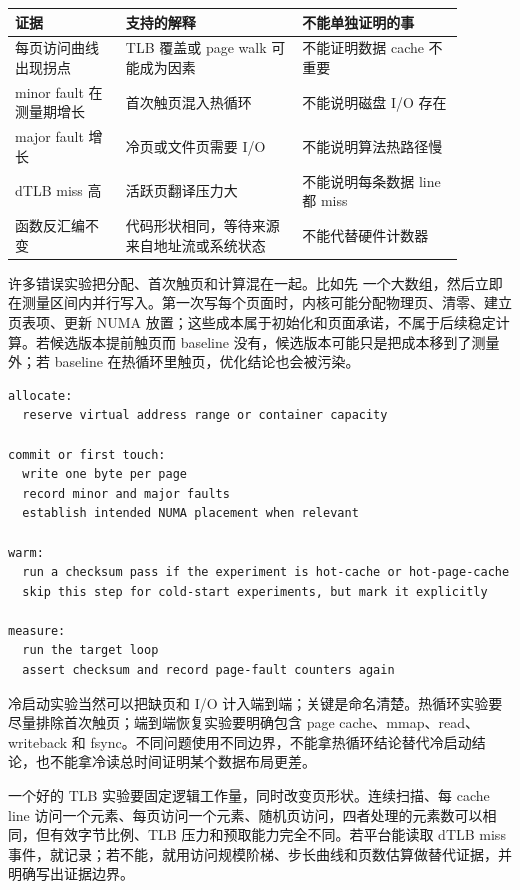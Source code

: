 \begin{center}
\small
\begin{tabular}{@{}p{0.22\linewidth}p{0.35\linewidth}p{0.32\linewidth}@{}}
\toprule
证据 & 支持的解释 & 不能单独证明的事 \\
\midrule
每页访问曲线出现拐点 & TLB 覆盖或 page walk 可能成为因素 & 不能证明数据 cache 不重要 \\
minor fault 在测量期增长 & 首次触页混入热循环 & 不能说明磁盘 I/O 存在 \\
major fault 增长 & 冷页或文件页需要 I/O & 不能说明算法热路径慢 \\
dTLB miss 高 & 活跃页翻译压力大 & 不能说明每条数据 line 都 miss \\
函数反汇编不变 & 代码形状相同，等待来源来自地址流或系统状态 & 不能代替硬件计数器 \\
\bottomrule
\end{tabular}
\end{center}

许多错误实验把分配、首次触页和计算混在一起。比如先  一个大数组，然后立即在测量区间内并行写入。第一次写每个页面时，内核可能分配物理页、清零、建立页表项、更新 NUMA 放置；这些成本属于初始化和页面承诺，不属于后续稳定计算。若候选版本提前触页而 baseline 没有，候选版本可能只是把成本移到了测量外；若 baseline 在热循环里触页，优化结论也会被污染。

\begin{lstlisting}[numbers=none,caption={把页级生命周期拆成四段}]
allocate:
  reserve virtual address range or container capacity

commit or first touch:
  write one byte per page
  record minor and major faults
  establish intended NUMA placement when relevant

warm:
  run a checksum pass if the experiment is hot-cache or hot-page-cache
  skip this step for cold-start experiments, but mark it explicitly

measure:
  run the target loop
  assert checksum and record page-fault counters again
\end{lstlisting}

冷启动实验当然可以把缺页和 I/O 计入端到端；关键是命名清楚。热循环实验要尽量排除首次触页；端到端恢复实验要明确包含 page cache、mmap、read、writeback 和 fsync。不同问题使用不同边界，不能拿热循环结论替代冷启动结论，也不能拿冷读总时间证明某个数据布局更差。

一个好的 TLB 实验要固定逻辑工作量，同时改变页形状。连续扫描、每 cache line 访问一个元素、每页访问一个元素、随机页访问，四者处理的元素数可以相同，但有效字节比例、TLB 压力和预取能力完全不同。若平台能读取 dTLB miss 事件，就记录；若不能，就用访问规模阶梯、步长曲线和页数估算做替代证据，并明确写出证据边界。

